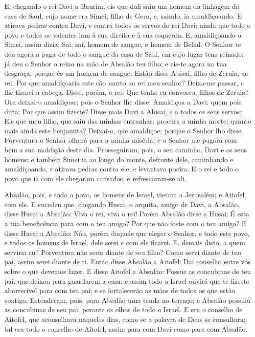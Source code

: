 E, chegando o rei Davi a Baurim, eis que dali saiu um homem da
linhagem da casa de Saul, cujo nome era Simei, filho de Gera, e,
saindo, ia amaldiçoando. E atirava pedras contra Davi, e contra
todos os servos do rei Davi; ainda que todo o povo e todos os
valentes iam à sua direita e à sua esquerda. E, amaldiçoando-o
Simei, assim dizia: Sai, sai, homem de sangue, e homem de Belial.
O Senhor te deu agora a paga de todo o sangue da casa de Saul,
em cujo lugar tens reinado; já deu o Senhor o reino na mão de
Absalão teu filho; e eis-te agora na tua desgraça, porque és um
homem de sangue. Então disse Abisai, filho de Zeruia, ao rei:
Por que amaldiçoaria este cão morto ao rei meu senhor? Deixa-me
passar, e lhe tirarei a cabeça. Disse, porém, o rei: Que
tenho eu convosco, filhos de Zeruia? Ora deixai-o amaldiçoar; pois o
Senhor lhe disse: Amaldiçoa a Davi; quem pois diria: Por que assim
fizeste? Disse mais Davi a Abisai, e a todos os seus servos:
Eis que meu filho, que saiu das minhas entranhas, procura a minha
morte; quanto mais ainda este benjamita? Deixai-o, que amaldiçoe;
porque o Senhor lho disse. Porventura o Senhor olhará para a
minha miséria; e o Senhor me pagará com bem a sua maldição deste
dia. Prosseguiram, pois, o seu caminho, Davi e os seus
homens; e também Simei ia ao longo do monte, defronte dele,
caminhando e amaldiçoando, e atirava pedras contra ele, e levantava
poeira. E o rei e todo o povo que ia com ele chegaram
cansados, e refrescaram-se ali.

Absalão, pois, e todo o povo, os homens de Israel, vieram a
Jerusalém; e Aitofel com ele. E sucedeu que, chegando Husai,
o arquita, amigo de Davi, a Absalão, disse Husai a Absalão: Viva o
rei, viva o rei! Porém Absalão disse a Husai: É esta a tua
beneficência para com o teu amigo? Por que não foste com o teu
amigo? E disse Husai a Absalão: Não, porém daquele que eleger
o Senhor, e todo este povo, e todos os homens de Israel, dele serei
e com ele ficarei. E, demais disto, a quem serviria eu?
Porventura não seria diante de seu filho? Como servi diante de teu
pai, assim serei diante de ti. Então disse Absalão a Aitofel:
Dai conselho entre vós sobre o que devemos fazer. E disse
Aitofel a Absalão: Possue as concubinas de teu pai, que deixou para
guardarem a casa; e assim todo o Israel ouvirá que te fizeste
aborrecível para com teu pai; e se fortalecerão as mãos de todos os
que estão contigo. Estenderam, pois, para Absalão uma tenda
no terraço; e Absalão possuiu as concubinas de seu pai, perante os
olhos de todo o Israel. E era o conselho de Aitofel, que
aconselhava naqueles dias, como se a palavra de Deus se consultara;
tal era todo o conselho de Aitofel, assim para com Davi como para
com Absalão.

